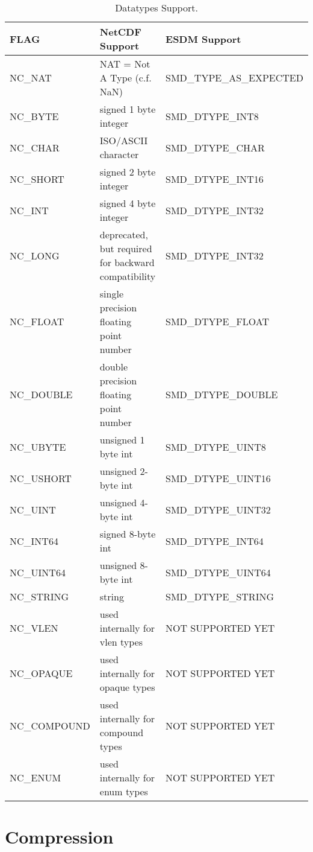 \begin{table}[H]
\centering
\begin{tabular}{|l|m{6.4cm}|l|}
\hline
FLAG & NetCDF Support & ESDM Support \\ \hline \hline
NC\_NAT & NAT = Not A Type (c.f. NaN) &    SMD\_TYPE\_AS\_EXPECTED        \\ \hline
NC\_BYTE & signed 1 byte integer &     SMD\_DTYPE\_INT8        \\ \hline
NC\_CHAR & ISO/ASCII character &      SMD\_DTYPE\_CHAR       \\ \hline
NC\_SHORT & signed 2 byte integer &   SMD\_DTYPE\_INT16          \\ \hline
NC\_INT & signed 4 byte integer &     SMD\_DTYPE\_INT32        \\ \hline
NC\_LONG & deprecated, but required for backward compatibility &    SMD\_DTYPE\_INT32         \\ \hline
NC\_FLOAT & single precision floating point number &   SMD\_DTYPE\_FLOAT           \\ \hline
NC\_DOUBLE & double precision floating point number &   SMD\_DTYPE\_DOUBLE          \\ \hline
NC\_UBYTE & unsigned 1 byte int &     SMD\_DTYPE\_UINT8        \\ \hline
NC\_USHORT & unsigned 2-byte int &    SMD\_DTYPE\_UINT16         \\ \hline
NC\_UINT & unsigned 4-byte int &   SMD\_DTYPE\_UINT32          \\ \hline
NC\_INT64 & signed 8-byte int &    SMD\_DTYPE\_INT64         \\ \hline
NC\_UINT64 & unsigned 8-byte int &    SMD\_DTYPE\_UINT64         \\ \hline
NC\_STRING & string &    SMD\_DTYPE\_STRING         \\ \hline
NC\_VLEN & used internally for vlen types &      NOT SUPPORTED YET       \\ \hline
NC\_OPAQUE & used internally for opaque types &     NOT SUPPORTED YET        \\ \hline
NC\_COMPOUND & used internally for compound types &    NOT SUPPORTED YET         \\ \hline
NC\_ENUM & used internally for enum types &       NOT SUPPORTED YET      \\ \hline \hline
\end{tabular}
\caption{Datatypes Support.}
\end{table}

\section{Compression}

